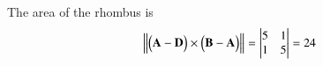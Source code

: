 The area of the rhombus is
\begin{align}
                \norm{\myvec{\vec{A-D}}\times \myvec{\vec{B-A}}}=\mydet{5 & 1\\1 & 5} = 24
\end{align}

